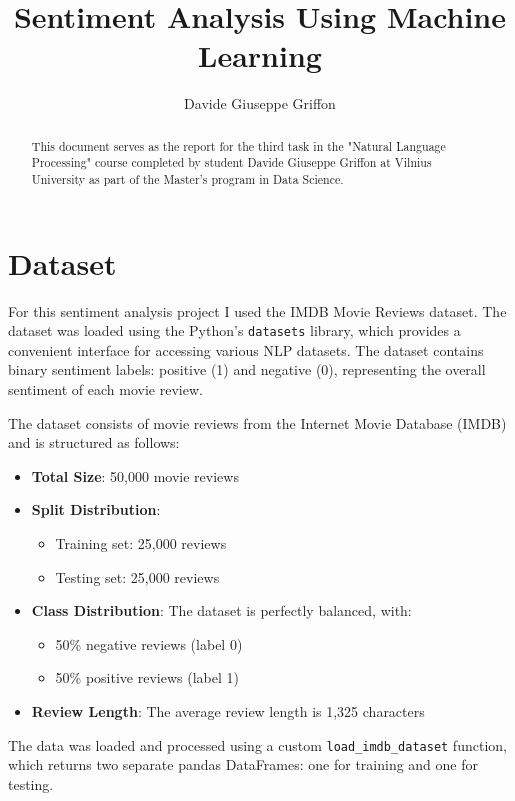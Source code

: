 \documentclass[12pt]{article}
\title{Sentiment Analysis Using Machine Learning}
\author{Davide Giuseppe Griffon}
\date{}
\begin{document}
\maketitle

\begin{abstract}
    This document serves as the report for the third task in the "Natural Language Processing" course completed by student Davide Giuseppe Griffon at Vilnius University as part of the Master's program in Data Science.
\end{abstract}

\tableofcontents

\newpage



\section{Dataset}
For this sentiment analysis project I used the IMDB Movie Reviews dataset. The dataset was loaded using the Python's \texttt{datasets} library, which provides a convenient interface for accessing various NLP datasets. The dataset contains binary sentiment labels: positive (1) and negative (0), representing the overall sentiment of each movie review.

The dataset consists of movie reviews from the Internet Movie Database (IMDB) and is structured as follows:
\begin{itemize}
   \item \textbf{Total Size}: 50,000 movie reviews
   \item \textbf{Split Distribution}:
       \begin{itemize}
           \item Training set: 25,000 reviews
           \item Testing set: 25,000 reviews
       \end{itemize}
   \item \textbf{Class Distribution}: The dataset is perfectly balanced, with:
       \begin{itemize}
           \item 50\% negative reviews (label 0)
           \item 50\% positive reviews (label 1)
       \end{itemize}
   \item \textbf{Review Length}: The average review length is 1,325 characters
\end{itemize}

The data was loaded and processed using a custom \texttt{load\_imdb\_dataset} function, which returns two separate pandas DataFrames: one for training and one for testing.
\end{document}
